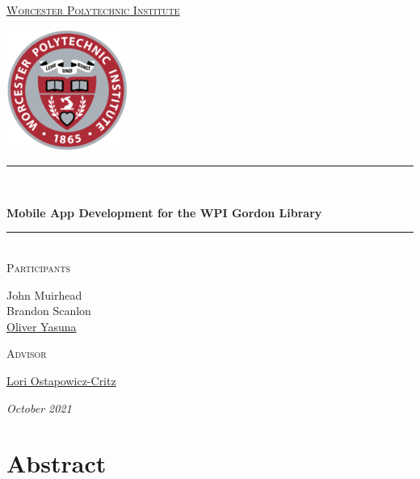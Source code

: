 \documentclass[oneside, 12pt]{book}
\begin{document}
\begin{titlepage}
    \centering
    {\LARGE\scshape \href{https://www.wpi.edu/}{Worcester Polytechnic Institute}\par}
    \vspace*{1.2cm}
    \href{https://www.wpi.edu/}{\includegraphics[]{assets/img/150px-WPI_logo.png}}\\
    \vspace*{2cm}
    \rule{\textwidth}{1pt}\\
    \vspace{0.5cm}
    {\huge\bfseries Mobile App Development for the WPI Gordon Library\par} %
    \vspace{0.5cm}
    \rule{\textwidth}{1pt}\\
    \vspace{2cm}
    {\large\scshape Participants} \\[\baselineskip]
    {\Large
        John Muirhead\\ %
        Brandon Scanlon\\ %
        \href{https://oliveryasuna.github.io/}{Oliver Yasuna}
    \par}
    \vspace{1cm}
    {\large\scshape Advisor} \\[\baselineskip]
    {\Large \href{https://www.wpi.edu/people/staff/lostapowiczcritz}{Lori Ostapowicz-Critz}\par}
    \vfill
    {\itshape October 2021\par} %
\end{titlepage}

\frontmatter
    \tableofcontents
    \chapter{Abstract}
        
\end{document}
